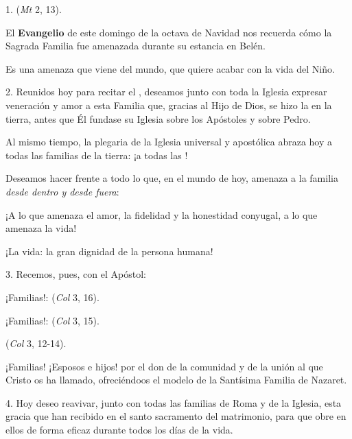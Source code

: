 				\begin{body}
					1.  (\emph{Mt} 2, 13).
					
					El \textbf{Evangelio} de este domingo de la octava de Navidad nos recuerda cómo la Sagrada Familia fue amenazada durante su estancia en Belén.
					
					Es una amenaza que viene del mundo, que quiere acabar con la vida del Niño.
					
					2. Reunidos hoy para recitar el , deseamos junto con toda la Iglesia expresar veneración y amor a esta Familia que, gracias al Hijo de Dios, se hizo la  en la tierra, antes que Él fundase su Iglesia sobre los Apóstoles y sobre Pedro.
					
					Al mismo tiempo, la plegaria de la Iglesia universal y apostólica abraza hoy a todas las familias de la tierra: ¡a todas las !
					
					Deseamos hacer frente a todo lo que, en el mundo de hoy, amenaza a la familia \emph{desde dentro y desde fuera}:
					
					¡A lo que amenaza el amor, la fidelidad y la honestidad conyugal, a lo que amenaza la vida!
					
					¡La vida: la gran dignidad de la persona humana!
					
					3. Recemos, pues, con el Apóstol:
					
					¡Familias!:  (\emph{Col} 3, 16).
					
					¡Familias!:  (\emph{Col} 3, 15).
					
					 (\emph{Col} 3, 12-14).
					
					¡Familias! ¡Esposos e hijos!  por el don de la comunidad y de la unión al que Cristo os ha llamado, ofreciéndoos el modelo de la Santísima Familia de Nazaret.
					
					4. Hoy deseo reavivar, junto con todas las familias de Roma y de la Iglesia, esta gracia que han recibido en el santo sacramento del matrimonio, para que obre en ellos de forma eficaz durante todos los días de la vida.
				\end{body}
			
